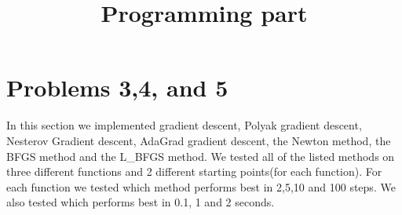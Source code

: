 \documentclass[9pt]{IEEEtran}
\title{\vspace{0ex}
Programming part}
\begin{document}
\maketitle

\section{Problems 3,4, and 5}
In this section we implemented gradient descent, Polyak gradient descent, 
Nesterov Gradient descent, AdaGrad gradient descent, the Newton method, 
the BFGS method and the L\_BFGS method. We tested all of the listed methods 
on three different functions and 2 different starting points(for each function).
For each function we tested which method performs best in 2,5,10 and 100 steps.
We also tested which performs best in 0.1, 1 and 2 seconds.
\end{document}

